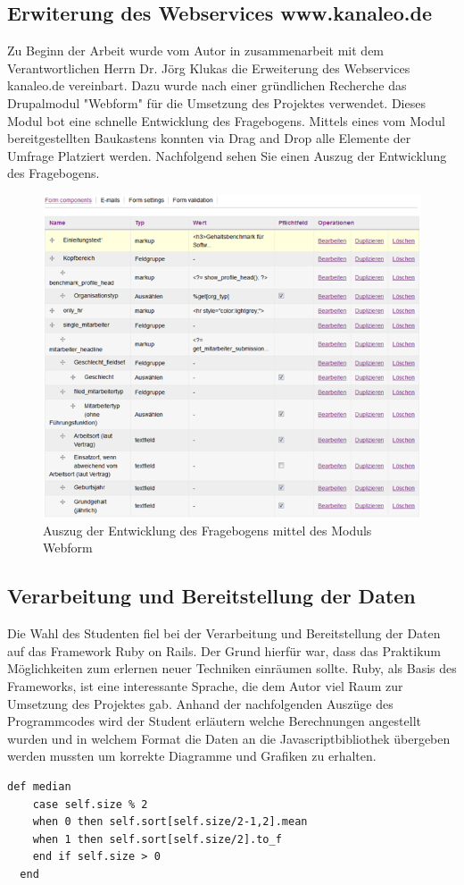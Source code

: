 \subsection{Erwiterung des Webservices www.kanaleo.de}
Zu Beginn der Arbeit wurde vom Autor in zusammenarbeit mit dem Verantwortlichen
Herrn Dr. Jörg Klukas die Erweiterung des Webservices kanaleo.de
vereinbart. Dazu wurde nach einer gründlichen Recherche das Drupalmodul
"Webform" für die Umsetzung des Projektes verwendet. Dieses Modul bot eine
schnelle Entwicklung des Fragebogens. Mittels eines vom Modul bereitgestellten
Baukastens konnten via Drag and Drop alle Elemente der Umfrage Platziert
werden. Nachfolgend sehen Sie einen Auszug der Entwicklung des
Fragebogens.\begin{figure}
 \centering
 \includegraphics{material/fragebogen.png}
 \caption{Auszug der Entwicklung des Fragebogens mittel des Moduls Webform}
\end{figure}
\newpage 
\subsection{Verarbeitung und Bereitstellung der Daten}
Die Wahl des Studenten fiel bei der Verarbeitung und Bereitstellung der Daten
auf das Framework Ruby on Rails. Der Grund hierfür war, dass das Praktikum
Möglichkeiten zum erlernen neuer Techniken einräumen sollte. Ruby, als Basis
des Frameworks, ist eine interessante Sprache, die dem Autor viel Raum zur
Umsetzung des Projektes gab. Anhand der nachfolgenden Auszüge des Programmcodes
wird der Student erläutern welche Berechnungen angestellt wurden und in welchem
Format die Daten an die Javascriptbibliothek übergeben werden mussten um
korrekte Diagramme und Grafiken zu erhalten. 
\lstset{language=ruby}
\begin{lstlisting}
def median
    case self.size % 2
    when 0 then self.sort[self.size/2-1,2].mean
    when 1 then self.sort[self.size/2].to_f
    end if self.size > 0            
  end
\end{lstlisting}

